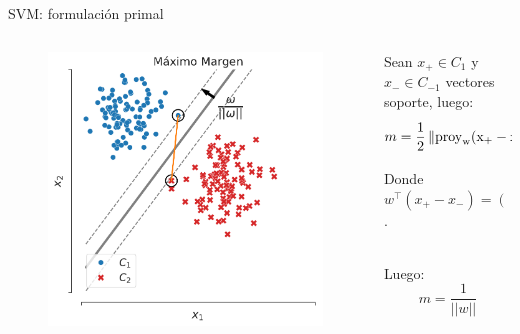 \documentclass[handout, 9pt]{beamer}
\begin{document}
\begin{frame}{SVM: formulación primal}

\begin{columns}

\begin{column}{0.4\textwidth}
\begin{figure}[ht]
    \centering
    \includegraphics[width=\textwidth]{../img/cap5_max_margen2.pdf}
\end{figure}
\end{column}

\begin{column}{0.6\textwidth}

Sean $x_+\in C_1$ y $x_-\in C_{-1}$ vectores soporte, luego:
\begin{equation*}
	m = \frac{1}{2} \norm{\operatorfont{proy}_w(x_+-x_-)} =\frac{1}{2} \frac{w^\top(x_+ - x_-)}{\norm{w}}
\end{equation*}

Donde $w^\top(x_+ - x_-) = \left((1-b) - (-1-b)\right) = 2$.\\~\

Luego:
\begin{equation*}
	m=\frac{1}{||w||}
\end{equation*}

\end{column}


\end{columns}
\end{frame}
\end{document}
